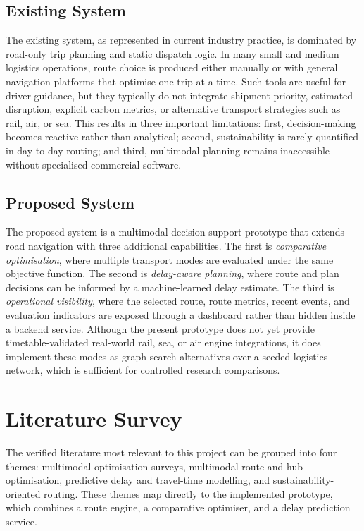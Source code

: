 \subsection{Existing System}
The existing system, as represented in current industry practice, is dominated by road-only trip planning and static dispatch logic. In many small and medium logistics operations, route choice is produced either manually or with general navigation platforms that optimise one trip at a time. Such tools are useful for driver guidance, but they typically do not integrate shipment priority, estimated disruption, explicit carbon metrics, or alternative transport strategies such as rail, air, or sea. This results in three important limitations: first, decision-making becomes reactive rather than analytical; second, sustainability is rarely quantified in day-to-day routing; and third, multimodal planning remains inaccessible without specialised commercial software.

\subsection{Proposed System}
The proposed system is a multimodal decision-support prototype that extends road navigation with three additional capabilities. The first is \textit{comparative optimisation}, where multiple transport modes are evaluated under the same objective function. The second is \textit{delay-aware planning}, where route and plan decisions can be informed by a machine-learned delay estimate. The third is \textit{operational visibility}, where the selected route, route metrics, recent events, and evaluation indicators are exposed through a dashboard rather than hidden inside a backend service. Although the present prototype does not yet provide timetable-validated real-world rail, sea, or air engine integrations, it does implement these modes as graph-search alternatives over a seeded logistics network, which is sufficient for controlled research comparisons.

\section{Literature Survey}
The verified literature most relevant to this project can be grouped into four themes: multimodal optimisation surveys, multimodal route and hub optimisation, predictive delay and travel-time modelling, and sustainability-oriented routing. These themes map directly to the implemented prototype, which combines a route engine, a comparative optimiser, and a delay prediction service.

